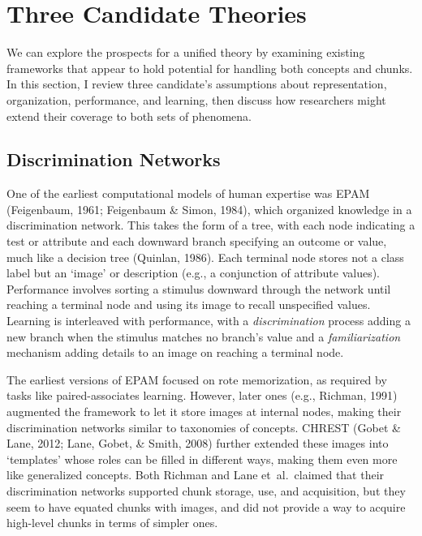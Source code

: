 \documentclass[11pt,letterpaper]{article}
\begin{document}
\section{Three Candidate Theories}

We can explore the prospects for a unified theory by examining existing
frameworks that appear to hold potential for handling both concepts
and chunks. In this section, I review three candidate's assumptions
about representation, organization, performance, and learning, then
discuss how researchers might extend their coverage to both sets of
phenomena. 

\subsection{Discrimination Networks}

One of the earliest computational models of human expertise was EPAM 
(Feigenbaum, 1961; Feigenbaum \& Simon, 1984), which organized knowledge 
in a discrimination network. This takes the form of a tree, with each 
node indicating a test or attribute and each downward branch specifying 
an outcome or value, much like a decision tree (Quinlan, 1986). Each 
terminal node stores not a class label but an `image' or description 
(e.g., a conjunction of attribute values). Performance involves sorting 
a stimulus downward through the network until reaching a terminal
node and using its image to recall unspecified values. Learning is 
interleaved with performance, with a {\it discrimination\/} process 
adding a new branch when the stimulus matches no branch's value and
a {\it familiarization\/} mechanism adding details to an image on 
reaching a terminal node.

The earliest versions of EPAM focused on rote memorization, as required
by tasks like paired-associates learning. However, later ones (e.g.,
Richman, 1991) augmented the framework to let it store images at internal 
nodes, making their discrimination networks similar to taxonomies of 
concepts. CHREST (Gobet \& Lane, 2012; Lane, Gobet, \& Smith, 2008)
further extended these images into `templates' whose roles can be 
filled in different ways, making them even more like generalized
concepts. Both Richman and Lane et~al.\ claimed that their discrimination
networks supported chunk storage, use, and acquisition, but they seem 
to have equated chunks with images, and did not provide a way to acquire
high-level chunks in terms of simpler ones.
\end{document}
